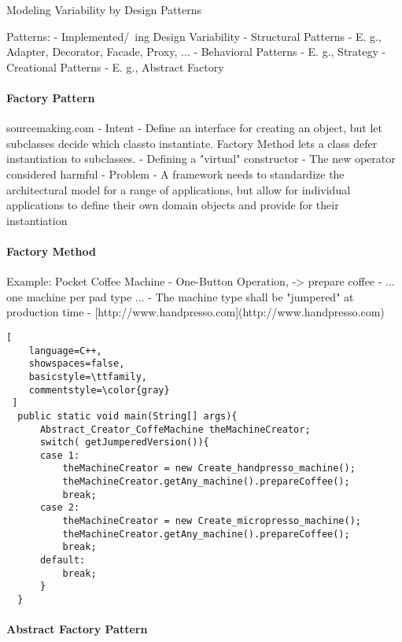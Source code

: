 \documentclass[a4paper]{article}
\begin{document}
\begin{multicols}{3}
  Modeling Variability by Design Patterns
  
  Patterns:
  - Implemented/~ing Design Variability
  - Structural Patterns
      - E. g., Adapter, Decorator, Facade, Proxy, ...
  - Behavioral Patterns
      - E. g., Strategy
  - Creational Patterns
      - E. g., Abstract Factory
  
  \paragraph{Factory Pattern}
  sourcemaking.com
  - Intent
      - Define an interface for creating an object, but let subclasses decide which classto instantiate. Factory Method lets a class defer instantiation to subclasses.
      - Defining a "virtual" constructor
      - The new operator considered harmful
  - Problem
      - A framework needs to standardize the architectural model for a range of applications, but allow for individual applications to define their own domain objects and provide for their instantiation
  
  \paragraph{Factory Method}
  
  Example: Pocket Coffee Machine
  - One-Button Operation, -> prepare coffee
      - ... one machine per pad type ...
  - The machine type shall be "jumpered" at production time
  - [http://www.handpresso.com](http://www.handpresso.com)
  

  \begin{lstlisting}[
    language=C++,
    showspaces=false,
    basicstyle=\ttfamily,
    commentstyle=\color{gray}
 ]
  public static void main(String[] args){
      Abstract_Creator_CoffeMachine theMachineCreator;
      switch( getJumperedVersion()){
      case 1:
          theMachineCreator = new Create_handpresso_machine();
          theMachineCreator.getAny_machine().prepareCoffee();
          break;
      case 2:
          theMachineCreator = new Create_micropresso_machine();
          theMachineCreator.getAny_machine().prepareCoffee();
          break;
      default:
          break;
      }
  }
  \end{lstlisting}
  
  \paragraph{Abstract Factory Pattern}
  

\end{multicols}
\end{document}

